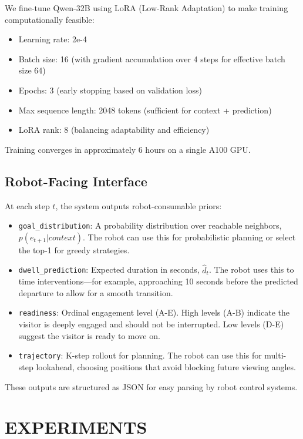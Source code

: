 \documentclass[letterpaper]{article}
\begin{document}
We fine-tune Qwen-32B using LoRA (Low-Rank Adaptation) to make training computationally feasible:
\begin{itemize}
    \item Learning rate: 2e-4
    \item Batch size: 16 (with gradient accumulation over 4 steps for effective batch size 64)
    \item Epochs: 3 (early stopping based on validation loss)
    \item Max sequence length: 2048 tokens (sufficient for context + prediction)
    \item LoRA rank: 8 (balancing adaptability and efficiency)
\end{itemize}

Training converges in approximately 6 hours on a single A100 GPU.

\subsection{Robot-Facing Interface}

At each step $t$, the system outputs robot-consumable priors:

\begin{itemize}
    \item \texttt{goal\_distribution}: A probability distribution over reachable neighbors, $p(e_{t+1} | context)$. The robot can use this for probabilistic planning or select the top-1 for greedy strategies.

    \item \texttt{dwell\_prediction}: Expected duration in seconds, $\hat{d}_t$. The robot uses this to time interventions—for example, approaching 10 seconds before the predicted departure to allow for a smooth transition.

    \item \texttt{readiness}: Ordinal engagement level (A-E). High levels (A-B) indicate the visitor is deeply engaged and should not be interrupted. Low levels (D-E) suggest the visitor is ready to move on.

    \item \texttt{trajectory}: K-step rollout for planning. The robot can use this for multi-step lookahead, choosing positions that avoid blocking future viewing angles.
\end{itemize}

These outputs are structured as JSON for easy parsing by robot control systems.

\section{EXPERIMENTS}
\end{document}
